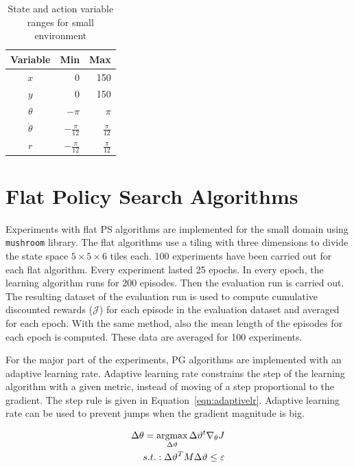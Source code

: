 \begin{table}[t]
  \centering
  \begin{tabular}{c r r}
     \toprule
     Variable & Min & Max \\
     \midrule
     $x$ & 0 & 150 \\ 
     $y$ & 0 & 150 \\
     $\theta$ & $-\pi$ & $\pi$ \\
     $\dot{\theta}$ & $-\frac{\pi}{12}$ & $\frac{\pi}{12}$ \\
     $r$ & $-\frac{\pi}{12}$ & $\frac{\pi}{12}$ \\
     \bottomrule
  \end{tabular}
  \caption{State and action variable ranges for small environment}
  \label{table:rangessmall}
\end{table}

\section{Flat Policy Search Algorithms}
Experiments with flat PS algorithms are implemented for the small domain using \texttt{mushroom} library. The flat algorithms use a tiling with three dimensions to divide the state space $5 \times 5 \times 6$ tiles each. 100 experiments have been carried out for each flat algorithm. Every experiment lasted 25 epochs. In every epoch, the learning algorithm runs for 200 episodes. Then the evaluation run is carried out. The resulting dataset of the evaluation run is used to compute cumulative discounted rewards ($\mathcal{J}$) for each episode in the evaluation dataset and averaged for each epoch. With the same method, also the mean length of the episodes for each epoch is computed. These data are averaged for 100 experiments.

For the major part of the experiments, PG algorithms are implemented with an adaptive learning rate. Adaptive learning rate constrains the step of the learning algorithm with a given metric, instead of moving of a step proportional to the gradient. The step rule is given in Equation~\ref{eqn:adaptivelr}. Adaptive learning rate can be used to prevent jumps when the gradient magnitude is big. 

\begin{equation}
\label{eqn:adaptivelr}
    \begin{aligned}
    \Delta\theta=\operatorname*{argmax}_{\Delta\vartheta}\Delta\vartheta^{t}\nabla_{\theta}J
    \\
    s.t.:\Delta\vartheta^{T}M\Delta\vartheta\leq\varepsilon
    \end{aligned}
\end{equation} 


